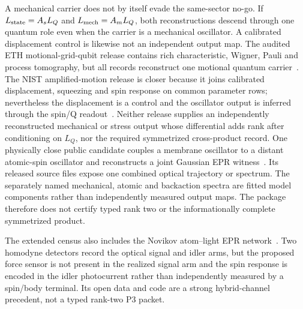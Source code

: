 A mechanical carrier does not by itself evade the same-sector no-go.  If
$L_{\rm state}=A_sL_Q$ and $L_{\rm mech}=A_mL_Q$, both reconstructions descend
through one quantum role even when the carrier is a mechanical oscillator.  A
calibrated displacement control is likewise not an independent output map.
The audited ETH motional-grid-qubit release contains rich characteristic,
Wigner, Pauli and process tomography, but all records reconstruct one motional
quantum carrier~\cite{Fluehmann2019}.  The NIST amplified-motion release is closer because it joins
calibrated displacement, squeezing and spin response on common parameter rows;
nevertheless the displacement is a control and the oscillator output is
inferred through the spin/Q readout~\cite{Burd2019}.  Neither release supplies an independently
reconstructed mechanical or stress output whose differential adds rank after
conditioning on $L_Q$, nor the required symmetrized cross-product record.
One physically close public candidate couples a membrane
oscillator to a distant atomic-spin oscillator and reconstructs a joint
Gaussian EPR witness~\cite{Thomas2021}.  Its released source files expose one
combined optical trajectory or spectrum.  The separately named mechanical,
atomic and backaction spectra are fitted model components rather than
independently measured output maps.  The package therefore does not certify
typed rank two or the informationally complete symmetrized product.

The extended census also includes the Novikov atom--light EPR
network~\cite{Novikov2025}. Two homodyne detectors record the optical signal
and idler arms, but the proposed force sensor is not present in the realized
signal arm and the spin response is encoded in the idler photocurrent rather
than independently measured by a spin/body terminal. Its open data and code
are a strong hybrid-channel precedent, not a typed rank-two P3 packet.

